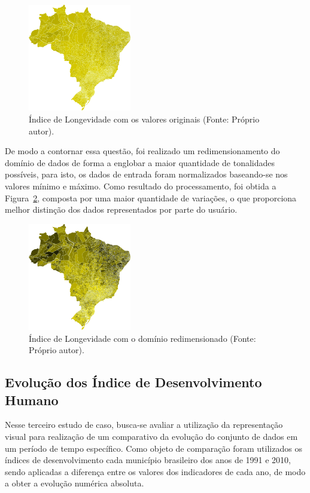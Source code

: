 \documentclass[conference]{IEEEtran}
\begin{document}
\begin{figure}[!ht]
\centering
\includegraphics[width=0.40\textwidth]{longevidade.png}
\caption{Índice de Longevidade com os valores originais (Fonte: Próprio autor).}
\label{img:longevidade-absoluto}
\end{figure}

De modo a contornar essa questão, foi realizado um redimensionamento do domínio de dados de forma a englobar a maior quantidade de tonalidades possíveis, para isto, os dados de entrada foram normalizados baseando-se nos valores mínimo e máximo. Como resultado do processamento, foi obtida a Figura~\ref{img:longevidade-ampliado}, composta por uma maior quantidade de variações, o que proporciona melhor distinção dos dados representados por parte do usuário.

\begin{figure}[!ht]
\centering
\includegraphics[width=0.40\textwidth]{longevidade-ampliado.png}
\caption{Índice de Longevidade com o domínio redimensionado (Fonte: Próprio autor).}
\label{img:longevidade-ampliado}
\end{figure}


\subsection{Evolução dos Índice de Desenvolvimento Humano}

Nesse terceiro estudo de caso, busca-se avaliar a utilização da representação visual para realização de um comparativo da evolução do conjunto de dados em um período de tempo específico. Como objeto de comparação foram utilizados os índices de desenvolvimento cada município brasileiro dos anos de 1991 e 2010, sendo aplicadas a diferença entre os valores dos indicadores de cada ano, de modo a obter a evolução numérica absoluta.
\end{document}
